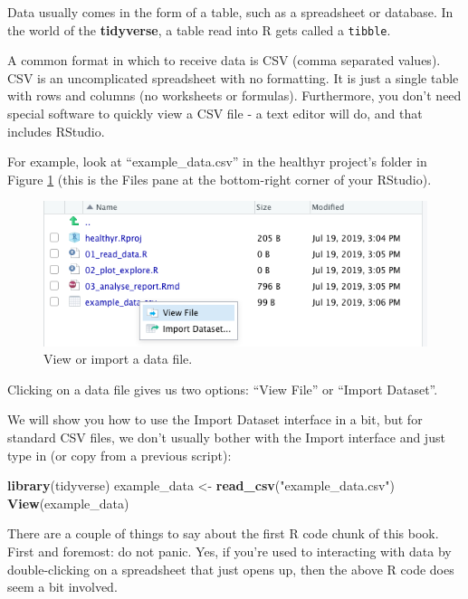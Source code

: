 \documentclass[
  12pt,
  krantz2]{krantz}
\makeatletter
\newenvironment{Shaded}{\begin{snugshade}}{\end{snugshade}}
\newcommand{\KeywordTok}[1]{\textcolor[rgb]{0.13,0.29,0.53}{\textbf{#1}}}
\newcommand{\NormalTok}[1]{#1}
\newcommand{\StringTok}[1]{\textcolor[rgb]{0.31,0.60,0.02}{#1}}
\newenvironment{kframe}{%
\medskip{}
\setlength{\fboxsep}{.8em}
 \def\at@end@of@kframe{}%
 \ifinner\ifhmode%
  \def\at@end@of@kframe{\end{minipage}}%
  \begin{minipage}{\columnwidth}%
 \fi\fi%
 \def\FrameCommand##1{\hskip\@totalleftmargin \hskip-\fboxsep
 \colorbox{shadecolor}{##1}\hskip-\fboxsep
     \hskip-\linewidth \hskip-\@totalleftmargin \hskip\columnwidth}%
 \MakeFramed {\advance\hsize-\width
   \@totalleftmargin\z@ \linewidth\hsize
   \@setminipage}}%
 {\par\unskip\endMakeFramed%
 \at@end@of@kframe}
\renewenvironment{Shaded}{\begin{kframe}}{\end{kframe}}
\makeatother
\begin{document}

Data usually comes in the form of a table, such as a spreadsheet or database.
In the world of the \textbf{tidyverse}, a table read into R gets called a \texttt{tibble}.

A common format in which to receive data is CSV (comma separated values).
CSV is an uncomplicated spreadsheet with no formatting.
It is just a single table with rows and columns (no worksheets or formulas).
Furthermore, you don't need special software to quickly view a CSV file - a text editor will do, and that includes RStudio.

For example, look at ``example\_data.csv'' in the healthyr project's folder in Figure \ref{fig:chap2-fig-examplecsv} (this is the Files pane at the bottom-right corner of your RStudio).

\begin{figure}

{\centering \includegraphics[width=0.7\linewidth]{images/chapter02/files_csv_example} 

}

\caption{View or import a data file.}\label{fig:chap2-fig-examplecsv}
\end{figure}

Clicking on a data file gives us two options: ``View File'' or ``Import Dataset''.

We will show you how to use the Import Dataset interface in a bit, but for standard CSV files, we don't usually bother with the Import interface and just type in (or copy from a previous script):

\begin{Shaded}
\begin{Highlighting}[]
\KeywordTok{library}\NormalTok{(tidyverse)}
\NormalTok{example_data <-}\StringTok{ }\KeywordTok{read_csv}\NormalTok{(}\StringTok{"example_data.csv"}\NormalTok{)}
\KeywordTok{View}\NormalTok{(example_data)}
\end{Highlighting}
\end{Shaded}

There are a couple of things to say about the first R code chunk of this book.
First and foremost: do not panic.
Yes, if you're used to interacting with data by double-clicking on a spreadsheet that just opens up, then the above R code does seem a bit involved.
\end{document}
